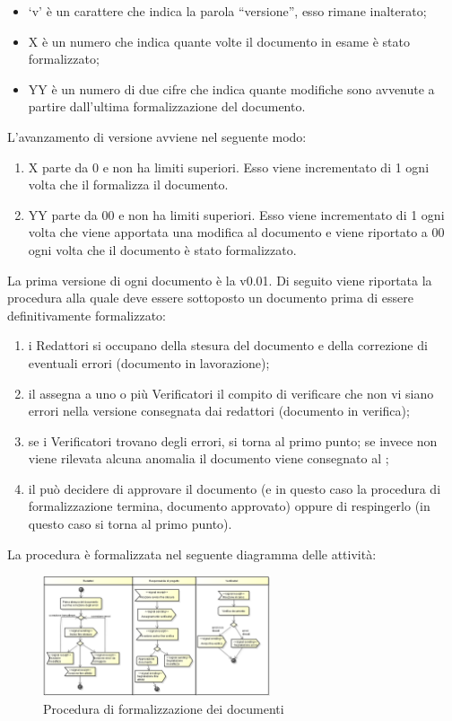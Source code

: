 				\begin{itemize}
					\item ‘v’ è un carattere che indica la parola “versione”, esso rimane inalterato;
					\item X è un numero che indica quante volte il documento in esame è stato formalizzato;
					\item YY è un numero di due cifre che indica quante modifiche sono avvenute a partire dall’ultima formalizzazione del documento.
				\end{itemize}
				L’avanzamento di versione avviene nel seguente modo:
				\begin{enumerate}
					\item X parte da 0 e non ha limiti superiori. Esso viene incrementato di 1 ogni volta che il  formalizza il documento.
					\item YY parte da 00 e non ha limiti superiori. Esso viene incrementato di 1 ogni volta che viene apportata una modifica al documento e viene riportato a 00 ogni volta che il documento è stato formalizzato.
				\end{enumerate}
				La prima versione di ogni documento è la v0.01.
				Di seguito viene riportata la procedura alla quale deve essere sottoposto un documento prima di essere definitivamente formalizzato:
				\begin{enumerate}
					\item i Redattori si occupano della stesura del documento e della correzione di eventuali errori (documento in lavorazione);
					\item il  assegna a uno o più Verificatori il compito di verificare che non vi siano errori nella versione consegnata dai redattori (documento in verifica);
					\item se i Verificatori trovano degli errori, si torna al primo punto; se invece non viene rilevata alcuna anomalia il documento viene consegnato al ;
					\item il  può decidere di approvare il documento (e in questo caso la procedura di formalizzazione termina, documento approvato) oppure di respingerlo (in questo caso si torna al primo punto).
				\end{enumerate}
				La procedura è formalizzata nel seguente diagramma delle attività:
				\begin{figure}[H]
					\centering
					\includegraphics[width=0.6\textwidth]{NormeDiProgetto/Pics/FormalizzazioneDocumenti}
					\caption{Procedura di formalizzazione dei documenti}
				\end{figure}
